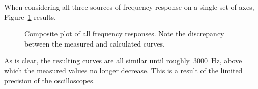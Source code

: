 When considering all three sources of frequency response on a single set of
axes, Figure~\ref{f:bodePlotComposite} results.
%
\begin{figure}[H]
	\centering
	
	\parbox{.6\textwidth}{
	\caption[Composite Bode Plot]{Composite plot of all frequency responses.
	Note the discrepancy between the measured and calculated curves.}
	\label{f:bodePlotComposite}}
\end{figure}
%
As is clear, the resulting curves are all similar until
roughly~\SI{3000}{\hertz}, above which the measured values no longer decrease.
This is a result of the limited precision of the oscilloscopes.
